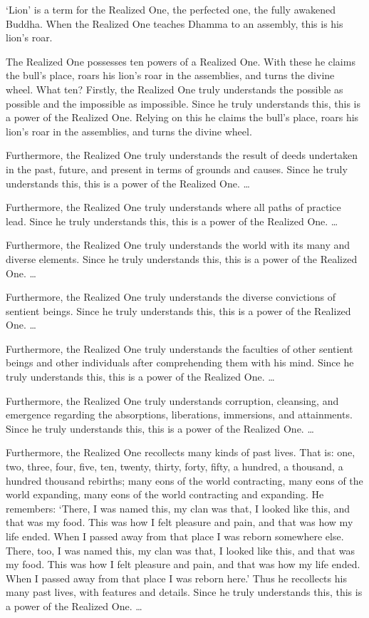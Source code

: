 \documentclass[12pt,openany]{book}%
\begin{document}
‘Lion’ is a term for the Realized One, the perfected one, the fully awakened Buddha. When the Realized One teaches Dhamma to an assembly, this is his lion’s roar. 

The Realized One possesses ten powers of a Realized One. With these he claims the bull’s place, roars his lion’s roar in the assemblies, and turns the divine wheel. What ten? Firstly, the Realized One truly understands the possible as possible and the impossible as impossible. Since he truly understands this, this is a power of the Realized One. Relying on this he claims the bull’s place, roars his lion’s roar in the assemblies, and turns the divine wheel. 

Furthermore, the Realized One truly understands the result of deeds undertaken in the past, future, and present in terms of grounds and causes. Since he truly understands this, this is a power of the Realized One. … 

Furthermore, the Realized One truly understands where all paths of practice lead. Since he truly understands this, this is a power of the Realized One. … 

Furthermore, the Realized One truly understands the world with its many and diverse elements. Since he truly understands this, this is a power of the Realized One. … 

Furthermore, the Realized One truly understands the diverse convictions of sentient beings. Since he truly understands this, this is a power of the Realized One. … 

Furthermore, the Realized One truly understands the faculties of other sentient beings and other individuals after comprehending them with his mind. Since he truly understands this, this is a power of the Realized One. … 

Furthermore, the Realized One truly understands corruption, cleansing, and emergence regarding the absorptions, liberations, immersions, and attainments. Since he truly understands this, this is a power of the Realized One. … 

Furthermore, the Realized One recollects many kinds of past lives. That is: one, two, three, four, five, ten, twenty, thirty, forty, fifty, a hundred, a thousand, a hundred thousand rebirths; many eons of the world contracting, many eons of the world expanding, many eons of the world contracting and expanding. He remembers: ‘There, I was named this, my clan was that, I looked like this, and that was my food. This was how I felt pleasure and pain, and that was how my life ended. When I passed away from that place I was reborn somewhere else. There, too, I was named this, my clan was that, I looked like this, and that was my food. This was how I felt pleasure and pain, and that was how my life ended. When I passed away from that place I was reborn here.’ Thus he recollects his many past lives, with features and details. Since he truly understands this, this is a power of the Realized One. … 
\end{document}
